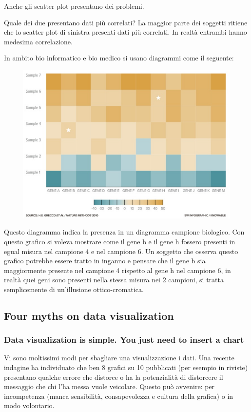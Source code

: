 \documentclass[12pt,a4paper]{report}
\begin{document}
Anche gli scatter plot presentano dei problemi. 

Quale dei due presentano dati più correlati? La maggior parte dei soggetti ritiene che lo scatter plot di sinistra presenti dati più correlati. In realtà entrambi hanno medesima correlazione. 

In ambito bio informatico e bio medico si usano diagrammi come il seguente:

\begin{figure}[h]
	\centering
	\includegraphics[width=.58\textwidth]{imgs datavis/quadri .png}\hfil
	
	\caption{}\label{}
\end{figure}

Questo diagramma indica la presenza in un diagramma campione biologico. Con questo grafico si voleva mostrare come il gene b e il gene h fossero presenti in egual misura nel campione 4 e nel campione 6. Un soggetto che osserva questo grafico potrebbe essere tratto in inganno e pensare che il gene b sia maggiormente presente nel campione 4 rispetto al gene h nel campione 6, in realtà quei geni sono presenti nella stessa misura nei 2 campioni, si tratta semplicemente di un'illusione ottico-cromatica.

\subsection{Four myths on data visualization}
\subsubsection{Data visualization is simple. You just need to insert a chart}

Vi sono moltissimi modi per sbagliare una visualizzazione i dati. Una recente indagine ha individuato che ben 8 grafici su 10 pubblicati (per esempio in riviste) presentano qualche errore che distorce o ha la potenzialità di distorcere il messaggio che chi l'ha messa vuole veicolare. Questo può avvenire: per incompetenza (manca sensibilità, consapevolezza e cultura della grafica) o in modo volontario.
\end{document}

